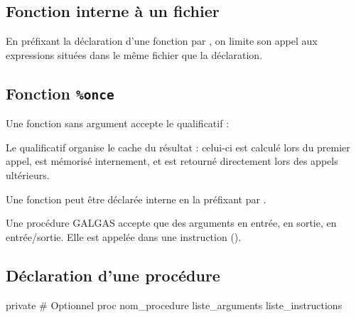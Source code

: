 \subsection{Fonction interne à un fichier}

En préfixant la déclaration d'une fonction par , on limite son appel aux expressions situées dans le même fichier que la déclaration.




\subsection{Fonction \texttt{\%once}}

Une fonction sans argument accepte le qualificatif  :


Le qualificatif  organise le cache du résultat : celui-ci est calculé lors du premier appel, est mémorisé internement, et est retourné directement lors des appels ultérieurs.

Une fonction  peut être déclarée interne en la préfixant par .







Une procédure GALGAS accepte que des arguments en entrée, en sortie, en entrée/sortie. Elle est appelée dans une instruction ().

\subsection{Déclaration d'une procédure}

\begin{galgascode}
private # Optionnel
proc nom_procedure liste_arguments {
  liste_instructions
}
\end{galgascode}

